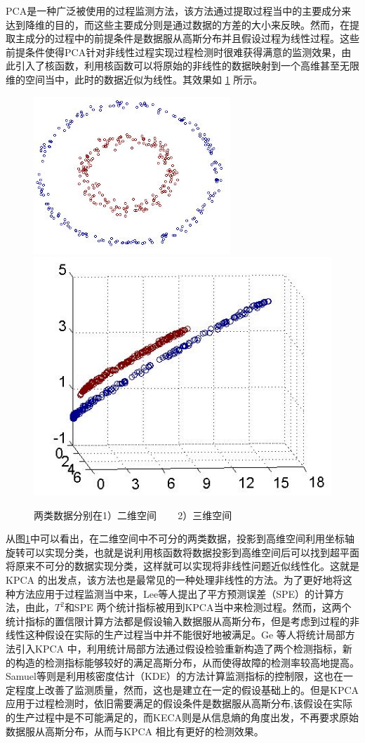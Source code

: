 PCA是一种广泛被使用的过程监测方法，该方法通过提取过程当中的主要成分来达到降维的目的，而这些主要成分则是通过数据的方差的大小来反映。然而，在提取主成分的过程中的前提条件是数据服从高斯分布并且假设过程为线性过程。这些前提条件使得PCA针对非线性过程实现过程检测时很难获得满意的监测效果，由此引入了核函数，利用核函数可以将原始的非线性的数据映射到一个高维甚至无限维的空间当中，此时的数据近似为线性。其效果如 \ref{Fig2D3D} 所示。
\begin{figure}[htb]
\centering
\includegraphics[scale=0.6]{./Pictures/kernel2D.jpg}
\includegraphics[scale=0.6]{./Pictures/kernel3D.jpg}
\caption{两类数据分别在1）二维空间 ~~~ 2）三维空间}
\label{Fig2D3D}
\end{figure}
从图\ref{Fig2D3D}中可以看出，在二维空间中不可分的两类数据，投影到高维空间利用坐标轴旋转可以实现分类，也就是说利用核函数将数据投影到高维空间后可以找到超平面将原来不可分的数据实现分类，这样就可以实现将非线性问题近似线性化。这就是KPCA 的出发点，该方法也是最常见的一种处理非线性的方法。为了更好地将这种方法应用于过程监测当中来，Lee等人提出了平方预测误差（SPE）的计算方法，由此，$T^2$和SPE 两个统计指标被用到KPCA当中来检测过程。然而，这两个统计指标的置信限计算方法都是假设输入数据服从高斯分布，但是考虑到过程的非线性这种假设在实际的生产过程当中并不能很好地被满足。Ge 等人将统计局部方法引入KPCA 中，利用统计局部方法通过假设检验重新构造了两个检测指标，新的构造的检测指标能够较好的满足高斯分布，从而使得故障的检测率较高地提高。Samuel等则是利用核密度估计（KDE）的方法计算监测指标的控制限，这也在一定程度上改善了监测质量，然而，这也是建立在一定的假设基础上的。但是KPCA应用于过程检测时，依旧需要满足的假设条件是数据服从高斯分布,该假设在实际的生产过程中是不可能满足的，而KECA则是从信息熵的角度出发，不再要求原始数据服从高斯分布，从而与KPCA 相比有更好的检测效果。\\
